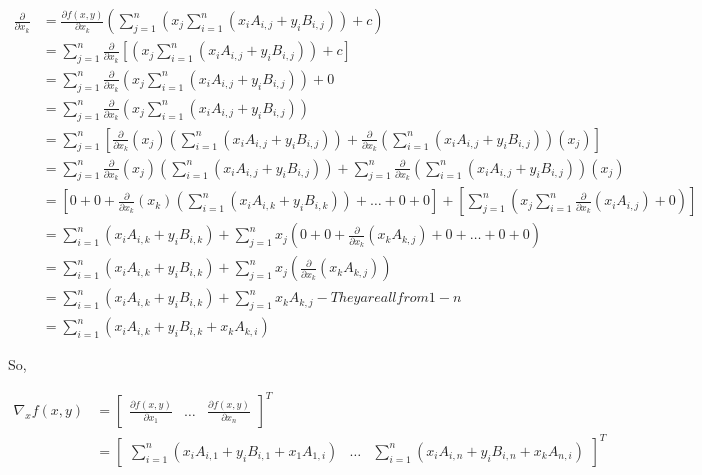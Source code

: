 \documentclass{article}
\begin{document}
\begin{equation}
\begin{split}
\frac{\partial}{\partial x_k} & = \frac{\partial f(x,y)}{\partial x_k}(\sum_{j=1}^n (x_j \sum_{i=1}^n (x_i A_{i,j}+ y_i B_{i,j}))+c) \\
 & = \sum_{j=1}^n \frac{\partial}{\partial x_k}[(x_j \sum_{i=1}^n (x_i A_{i,j}+ y_i B_{i,j}))+c] \\
 & = \sum_{j=1}^n \frac{\partial}{\partial x_k}(x_j \sum_{i=1}^n (x_i A_{i,j}+ y_i B_{i,j})) + 0 \\
 & = \sum_{j=1}^n \frac{\partial}{\partial x_k}(x_j \sum_{i=1}^n (x_i A_{i,j}+ y_i B_{i,j})) \\
 & = \sum_{j=1}^n [\frac{\partial}{\partial x_k}(x_j)( \sum_{i=1}^n (x_i A_{i,j}+ y_i B_{i,j}))+\frac{\partial}{\partial x_k}(\sum_{i=1}^n (x_i A_{i,j}+ y_i B_{i,j}))(x_j)] \\
 & = \sum_{j=1}^n \frac{\partial}{\partial x_k}(x_j)( \sum_{i=1}^n (x_i A_{i,j}+ y_i B_{i,j}))+ \sum_{j=1}^n \frac{\partial}{\partial x_k}(\sum_{i=1}^n (x_i A_{i,j}+ y_i B_{i,j}))(x_j) \\
 & = [0+0+\frac{\partial}{\partial x_k}(x_k)( \sum_{i=1}^n (x_i A_{i,k}+ y_i B_{i,k}))+\dots+0+0]+[\sum_{j=1}^n(x_j \sum_{i=1}^n \frac{\partial}{\partial x_k}(x_i A_{i,j})+0)] \\
 & = \sum_{i=1}^n (x_i A_{i,k}+ y_i B_{i,k}) + \sum_{j=1}^n x_j (0+0+\frac{\partial}{\partial x_k}(x_k A_{k,j})+0+\dots+0+0) \\
 & = \sum_{i=1}^n (x_i A_{i,k}+ y_i B_{i,k}) + \sum_{j=1}^n x_j (\frac{\partial}{\partial x_k}(x_k A_{k,j})) \\
 & = \sum_{i=1}^n (x_i A_{i,k}+ y_i B_{i,k}) + \sum_{j=1}^n x_k A_{k,j} - They are all from 1-n \\
 & = \sum_{i=1}^n (x_i A_{i,k}+ y_i B_{i,k} + x_k A_{k,i})
\end{split}
\end{equation}

So,

\begin{equation}
\begin{split}
\nabla_x f(x,y) & = \begin{bmatrix}
\frac{\partial f(x,y)}{\partial x_1} &
\dots &
\frac{\partial f(x,y)}{\partial x_n}
\end{bmatrix}^T \\
& = \begin{bmatrix}
\sum_{i=1}^n (x_i A_{i,1}+ y_i B_{i,1} + x_1 A_{1,i}) &
\dots &
\sum_{i=1}^n (x_i A_{i,n}+ y_i B_{i,n} + x_k A_{n,i})
\end{bmatrix}^T
\end{split}
\end{equation}
\end{document}
